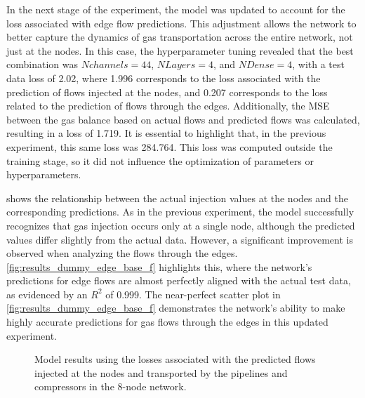 In the next stage of the experiment, the model was updated to account for the loss associated with edge flow predictions. This adjustment allows the network to better capture the dynamics of gas transportation across the entire network, not just at the nodes. In this case, the hyperparameter tuning revealed that the best combination was $N channels=44$, $N Layers=4$, and $N Dense=4$, with a test data loss of 2.02, where 1.996 corresponds to the loss associated with the prediction of flows injected at the nodes, and 0.207 corresponds to the loss related to the prediction of flows through the edges. Additionally, the MSE between the gas balance based on actual flows and predicted flows was calculated, resulting in a loss of 1.719. It is essential to highlight that, in the previous experiment, this same loss was 284.764. This loss was computed outside the training stage, so it did not influence the optimization of parameters or hyperparameters.


 shows the relationship between the actual injection values at the nodes and the corresponding predictions. As in the previous experiment, the model successfully recognizes that gas injection occurs only at a single node, although the predicted values differ slightly from the actual data. However, a significant improvement is observed when analyzing the flows through the edges. \cref{fig:results_dummy_edge_base_f} highlights this, where the network's predictions for edge flows are almost perfectly aligned with the actual test data, as evidenced by an $R^2$ of 0.999. The near-perfect scatter plot in \cref{fig:results_dummy_edge_base_f} demonstrates the network's ability to make highly accurate predictions for gas flows through the edges in this updated experiment.



\begin{figure}
    \centering
        \setlength{}        
        \setlength{} 
    \caption{Model results using the losses associated with the predicted flows injected at the nodes and transported by the pipelines and compressors in the 8-node network.}
    \label{fig:dummy_base_f_results}
\end{figure}


